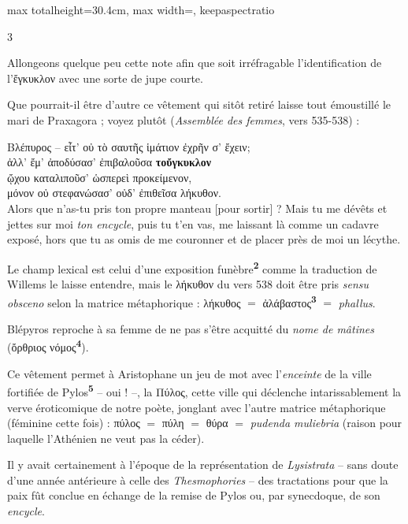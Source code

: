 \documentclass[11pt,twoside]{book}
\newcommand{\italique}[1]{\textit{#1}}
\newcommand{\citComm}[1]{\begin{quoting}[vskip=0.4pt,leftmargin=0.7em,rightmargin=0.2em]#1\end{quoting}}
\newcommand{\latin}[1]{\textit{#1}}
\newcommand{\marqueur}[1]{\textsuperscript{\color{rubricRed}\textbf{#1}}}
\begin{document}
\begin{adjustbox}{max totalheight=30.4cm, max width=\textwidth, keepaspectratio}
\begin{minipage}{\textwidth}
{\begin{multicols}{3}
\par\vspace{1.5pt}
\noindent Allongeons quelque peu cette note afin que soit irréfragable l'identification de l'ἔγκυκλον avec une sorte de jupe courte.\\
\par\vspace{1.5pt}
\noindent Que pourrait-il être d'autre ce vêtement qui sitôt retiré laisse tout émoustillé le mari de Praxagora ; voyez plutôt (\italique{Assemblée des femmes}, vers 535-538) :
\citComm{Βλέπυρος -- εἶτ' οὐ τὸ σαυτῆς ἱμάτιον ἐχρῆν σ' ἔχειν;\\
ἀλλ' ἔμ' ἀποδύσασ' ἐπιβαλοῦσα \textbf{τοὔγκυκλον}\\
ᾤχου καταλιποῦσ' ὡσπερεὶ προκείμενον,\\
μόνον οὐ στεφανώσασ' οὐδ' ἐπιθεῖσα λήκυθον.\\
Alors que n'as-tu pris ton propre manteau [pour sortir] ? Mais tu me dévêts et jettes sur moi \italique{ton encycle}, puis tu t'en vas, me laissant là comme un cadavre exposé, hors que tu as omis de me couronner et de placer près de moi un lécythe.}
\par\vspace{1.5pt}
\noindent Le champ lexical est celui d'une exposition funèbre\marqueur{2} comme la traduction de Willems le laisse entendre, mais le λήκυθον du vers 538 doit être pris \italique{sensu obsceno} selon la matrice métaphorique : λήκυθος $=$ ἀλάβαστος\marqueur{3} $=$ \latin{phallus}.
\par\vspace{1.5pt}
\noindent Blépyros reproche à sa femme de ne pas s'être acquitté du \italique{nome de mâtines} (ὄρθριος νόμος\marqueur{4}).
\par\vspace{1.5pt}
\noindent Ce vêtement permet à Aristophane un jeu de mot avec l'\italique{enceinte} de la ville fortifiée de Pylos\marqueur{5} -- oui ! --, la Πύλος, cette ville qui déclenche intarissablement la verve éroticomique de notre poète, jonglant avec l'autre matrice métaphorique (féminine cette fois) : πύλος $=$ πύλη $=$ θύρα $=$ \latin{pudenda muliebria} (raison pour laquelle l'Athénien ne veut pas la céder).
\par\vspace{1.5pt}
\noindent Il y avait certainement à l'époque de la représentation de \italique{Lysistrata} -- sans doute d'une année antérieure à celle des \italique{Thesmophories} -- des tractations pour que la paix fût conclue en échange de la remise de Pylos ou, par synecdoque, de son \italique{encycle}.

\end{multicols}}
\end{minipage}
\end{adjustbox}
\end{document}
